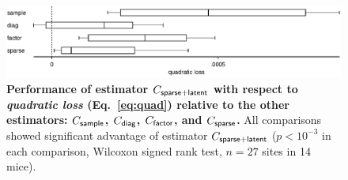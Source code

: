 \documentclass[10pt]{article}
\begin{document}
\begin{figure}[!ht]
\begin{center}
\includegraphics{./figures/src/Supp3.eps}
\end{center}
\caption{
{\bf Performance of estimator $C_{\sf sparse+latent}$ with respect to \emph{quadratic loss} (Eq.~\ref{eq:quad}) relative to the other estimators: $C_{\sf sample}$, $C_{\sf diag}$, $C_{\sf factor}$, and $C_{\sf sparse}$.} 
All comparisons showed significant advantage of estimator $C_{\sf sparse+latent}$ ($p<10^{-3}$ in each comparison, Wilcoxon signed rank test, $n=27$ sites in 14 mice).}
\label{supp:02}
\end{figure}
\end{document}
